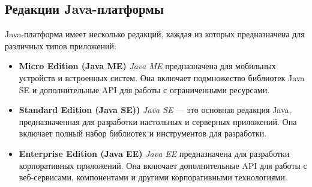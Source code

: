 \subsection{Редакции Java-платформы}
Java-платформа имеет несколько редакций, каждая из которых предназначена для различных типов приложений:
\begin{itemize}
    \item \textbf{Micro Edition (Java ME)} \newline
    \textit{Java ME} предназначена для мобильных устройств и встроенных систем. Она включает подмножество библиотек Java SE и дополнительные API для работы с ограниченными ресурсами.
    
    \item \textbf{Standard Edition (Java SE))} \newline
    \textit{Java SE} — это основная редакция Java, предназначенная для разработки настольных и серверных приложений. Она включает полный набор библиотек и инструментов для разработки.
    
    \item \textbf{Enterprise Edition (Java EE)} \newline
    \textit{Java EE} предназначена для разработки корпоративных приложений. Она включает дополнительные API для работы с веб-сервисами, компонентами и другими корпоративными технологиями.
    
\end{itemize}
